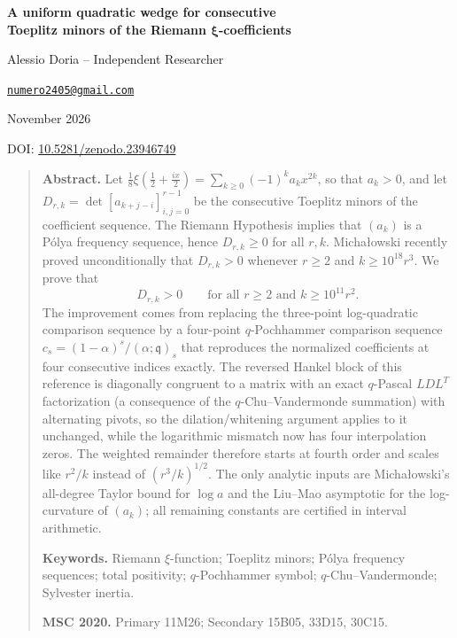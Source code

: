 \documentclass[11pt,a4paper]{article}
\numberwithin{equation}{section}
\theoremstyle{definition}
\theoremstyle{remark}
\newcommand{\qq}{\mathfrak q}
\begin{document}
\thispagestyle{plain}
\begin{center}
{\LARGE\bfseries A uniform quadratic wedge for consecutive\\[0.35em] Toeplitz minors of the Riemann $\boldsymbol{\xi}$-coefficients\par}
\vspace{1.4em}
{\large Alessio Doria -- Independent Researcher\par}
\vspace{0.3em}
{\normalsize\href{mailto:numero2405@gmail.com}{\texttt{numero2405@gmail.com}}\par}
\vspace{0.6em}
{\normalsize November 2026\par}
\vspace{0.3em}
{\normalsize DOI: \href{https://doi.org/10.5281/zenodo.23946749}{10.5281/zenodo.23946749}\par}
\end{center}
\vspace{1.2em}

\begin{quote}\small
\noindent\textbf{Abstract.} Let $\tfrac18\xi(\tfrac12+\tfrac{ix}{2})=\sum_{k\ge0}(-1)^ka_kx^{2k}$, so that $a_k>0$, and let
$D_{r,k}=\det[a_{k+j-i}]_{i,j=0}^{r-1}$ be the consecutive Toeplitz minors of the coefficient sequence.
The Riemann Hypothesis implies that $(a_k)$ is a P\'olya frequency sequence, hence $D_{r,k}\ge0$ for all $r,k$.
Michałowski recently proved unconditionally that $D_{r,k}>0$ whenever $r\ge2$ and $k\ge10^{18}r^3$.
We prove that
\[
D_{r,k}>0\qquad\text{for all } r\ge2 \text{ and } k\ge 10^{11}r^2 .
\]
The improvement comes from replacing the three-point log-quadratic comparison sequence by a
four-point $q$-Pochhammer comparison sequence $c_s=(1-\alpha)^s/(\alpha;\qq)_s$ that reproduces the
normalized coefficients at four consecutive indices exactly. The reversed Hankel block of this reference is diagonally
congruent to a matrix with an exact $q$-Pascal $LDL^{T}$ factorization (a consequence of the
$q$-Chu--Vandermonde summation) with alternating pivots, so the dilation/whitening argument applies
to it unchanged, while the logarithmic mismatch now has four interpolation zeros. The weighted remainder
therefore starts at fourth order and scales like $r^2/k$ instead of $(r^3/k)^{1/2}$.
The only analytic inputs are Michałowski's all-degree Taylor bound for $\log a$ and the
Liu--Mao asymptotic for the log-curvature of $(a_k)$; all remaining constants are
certified in interval arithmetic.

\medskip
\noindent\textbf{Keywords.} Riemann $\xi$-function; Toeplitz minors; P\'olya frequency sequences; total positivity;
$q$-Pochhammer symbol; $q$-Chu--Vandermonde; Sylvester inertia.

\noindent\textbf{MSC 2020.} Primary 11M26; Secondary 15B05, 33D15, 30C15.
\end{quote}
\vspace{0.8em}
\end{document}
